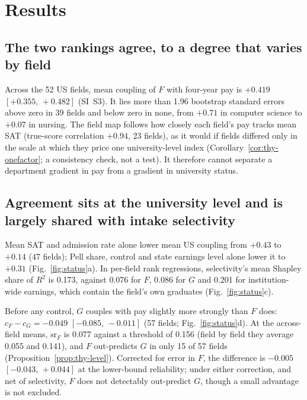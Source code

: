 \documentclass[11pt]{article}
\newcommand{\ci}[2]{$[#1,\allowbreak\,#2]$}
\begin{document}
\section{Results}\label{sec:results}

\subsection{The two rankings agree, to a degree that varies by field}\label{sec:res-map}

Across the 52 US fields, mean coupling of $F$ with four-year pay is $+0.419$ \ci{+0.355}{+0.482} (SI~S3). It lies
more than 1.96 bootstrap standard errors above zero in 39 fields and below zero in none, from $+0.71$ in computer
science to $+0.07$ in nursing. The field map follows how closely each field's pay tracks mean SAT (true-score
correlation $+0.94$, 23 fields), as it would if fields differed only in the scale at which they price one
university-level index (Corollary~\ref{cor:thy-onefactor}; a consistency check, not a test). It therefore cannot
separate a department gradient in pay from a gradient in university status.

\subsection{Agreement sits at the university level and is largely shared with intake selectivity}\label{sec:res-name}

Mean SAT and admission rate alone lower mean US coupling from $+0.43$ to $+0.14$ (47 fields); Pell share, control and
state earnings level alone lower it to $+0.31$ (Fig.~\ref{fig:status}a). In per-field rank regressions, selectivity's
mean Shapley share of $R^2$ is 0.173, against 0.076 for $F$, 0.086 for $G$ and 0.201 for institution-wide earnings,
which contain the field's own graduates (Fig.~\ref{fig:status}c).

Before any control, $G$ couples with pay slightly more strongly than $F$ does: $c_F-c_G=-0.049$ \ci{-0.085}{-0.011}
(57 fields; Fig.~\ref{fig:status}d). At the across-field means, $\mathrm{sr}_F$ is 0.077 against a threshold of 0.156
(field by field they average 0.055 and 0.141), and $F$ out-predicts $G$ in only 15 of 57 fields
(Proposition~\ref{prop:thy-level}). Corrected for error in $F$, the difference is $-0.005$ \ci{-0.043}{+0.044} at the
lower-bound reliability; under either correction, and net of selectivity, $F$ does not detectably out-predict $G$,
though a small advantage is not excluded.
\end{document}
